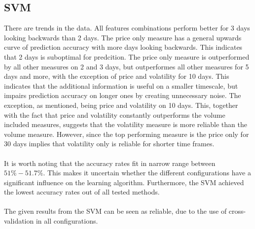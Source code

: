 \documentclass{article}
\begin{document}
\subsection{SVM}
There are trends in the data. All features combinations perform better for 3 days looking backwards than 2 days. The price only measure has a general upwards curve of prediction accuracy with more days looking backwards. This indicates that 2 days is suboptimal for predcition. The price only measure is outperformed by all other measures on 2 and 3 days, but outperformes all other measures for 5 days and more, with the exception of price and volatility for 10 days. This indicates that the additional information is useful on a smaller timescale, but impairs prediction accuracy on longer ones by creating unnecessary noise. The exception, as mentioned, being price and volatility on 10 days. This, together with the fact that price and volatility constantly outperforms the volume included measures, suggests that the volatility measure is more reliable than the volume measure. However, since the top performing measure is the price only for 30 days implies that volatility only is reliable for shorter time frames.
\\ \\
It is worth noting that the accuracy rates fit in narrow range between $51\%-51.7\%$. This makes it uncertain whether the different configurations have a significant influence on the learning algorithm. Furthermore, the SVM achieved the lowest accuracy rates out of all tested methods.
\\ \\
The given results from the SVM can be seen as reliable, due to the use of cross-validation in all configurations.
\end{document}
